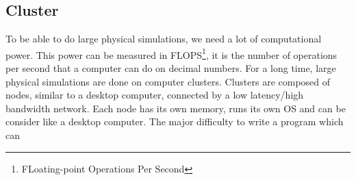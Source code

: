 \subsection{Cluster}
To be able to do large physical simulations, we need a lot of computational power.
%
This power can be measured in FLOPS\footnote{FLoating-point Operations Per Second}, it is the number of operations per second that a computer can do on decimal numbers.
%
For a long time, large physical simulations are done on computer clusters.
%
Clusters are composed of nodes, similar to a desktop computer, connected by a low latency/high bandwidth network.
%
Each node has its own memory, runs its own OS and can be consider like a desktop computer.
%
The major difficulty to write a program which can
